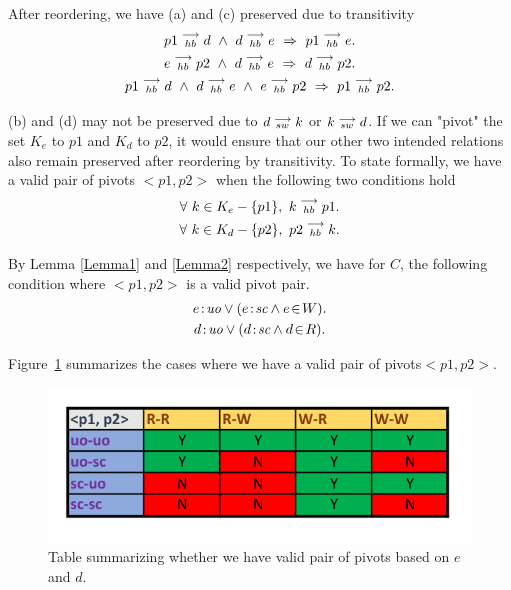     After reordering, we have (a) and (c) preserved due to transitivity  
    \begin{gather*}
        \reln{p1}{hb}{d} \ \wedge \ \reln{d}{hb}{e} \ \Rightarrow \ \reln{p1}{hb}{e}. \\
        \reln{e}{hb}{p2} \ \wedge \ \reln{d}{hb}{e} \ \Rightarrow \ \reln{d}{hb}{p2}. \\
        \reln{p1}{hb}{d} \ \wedge \ \reln{d}{hb}{e} \ \wedge \ \reln{e}{hb}{p2} \ \Rightarrow \ \reln{p1}{hb}{p2}. 
    \end{gather*}

    (b) and (d) may not be preserved due to $d\stackrel{\longrightarrow}{_{sw}}k$ or $k\stackrel{\longrightarrow}{_{sw}}d$. If we can "pivot" the  set $K_e$ to $p1$ and $K_d$ to $p2$, it would ensure that our other two intended relations also remain preserved after reordering by transitivity. To state formally, we have a valid pair of pivots $<p1,p2>$ when the following two conditions hold
    \begin{gather*}
        \forall \ k \in K_e - \{p1\}, \ k\stackrel{\longrightarrow}{_{hb}}p1. \\
        \forall \ k \in K_d - \{p2\}, \ p2\stackrel{\longrightarrow}{_{hb}}k.
    \end{gather*}
    
    By Lemma \ref{Lemma1} and \ref{Lemma2} respectively, we have for $C$, the following condition where $<p1, p2>$ is a valid pivot pair.
    \begin{gather*}
        \et{e}{uo} \vee (\et{e}{sc} \wedge \event{e}{W}). \\
        \et{d}{uo} \vee (\et{d}{sc} \wedge \event{d}{R}).
    \end{gather*}
        
    Figure~\ref{reord:preserve_hb_table} summarizes the cases where we have a valid pair of pivots\footnotemark $<p1,p2>$.
    \begin{figure}[H]
        \centering
        \includegraphics[scale=0.7]{4.InstructionReordering/4.ValidReorderingCandidate/ProofParts/Part1/part1_table.pdf}
        \caption{Table summarizing whether we have valid pair of pivots based on  $e$ and $d$.}
        \label{reord:preserve_hb_table}
    \end{figure}
            
